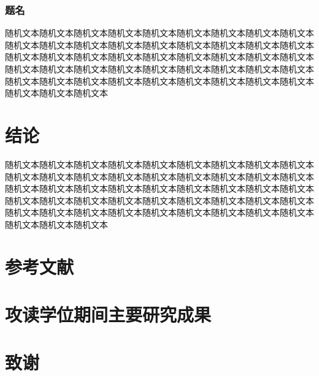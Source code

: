 \documentclass{paper}
\begin{document}
\subsubsection{题名}
随机文本随机文本随机文本随机文本随机文本随机文本随机文本随机文本随机文本随机文本随机文本随机文本随机文本随机文本随机文本随机文本随机文本随机文本随机文本随机文本随机文本随机文本随机文本随机文本随机文本随机文本随机文本随机文本随机文本随机文本随机文本随机文本随机文本随机文本随机文本随机文本随机文本随机文本随机文本随机文本随机文本随机文本随机文本随机文本随机文本随机文本随机文本随机文本

\section{结论}
随机文本随机文本随机文本随机文本随机文本随机文本随机文本随机文本随机文本随机文本随机文本随机文本随机文本随机文本随机文本随机文本随机文本随机文本随机文本随机文本随机文本随机文本随机文本随机文本随机文本随机文本随机文本随机文本随机文本随机文本随机文本随机文本随机文本随机文本随机文本随机文本随机文本随机文本随机文本随机文本随机文本随机文本随机文本随机文本随机文本随机文本随机文本随机文本

\section*{参考文献}
\section*{攻读学位期间主要研究成果}
\section*{致谢}
\end{document}
